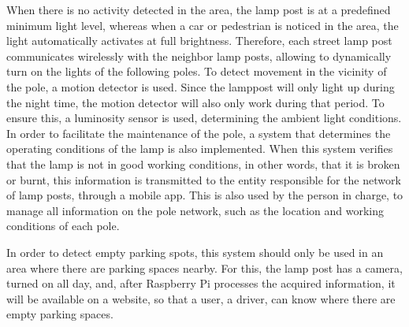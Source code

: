 When there is no activity detected in the area, the lamp post is at a predefined minimum light level, whereas when a car or pedestrian is noticed in the area, the light automatically activates at full brightness. Therefore, each street lamp post communicates wirelessly with the neighbor lamp posts, allowing to dynamically turn on the lights of the following poles. To detect movement in the vicinity of the pole, a motion detector is used. Since the lamppost will only light up during the night time, the motion detector will also only work during that period. To ensure this, a luminosity sensor is used, determining the ambient light conditions. In order to facilitate the maintenance of the pole, a system that determines the operating conditions of the lamp is also implemented. When this system verifies that the lamp is not in good working conditions, in other words, that it is broken or burnt, this information is transmitted to the entity responsible for the network of lamp posts, through a mobile app. This is also used by the person in charge, to manage all information on the pole network, such as the location and working conditions of each pole.

In order to detect empty parking spots, this system should only be used in an area where there are parking spaces nearby. For this, the lamp post has a camera, turned on all day, and, after Raspberry Pi processes the acquired information, it will be available on a website, so that a user, a driver, can know where there are empty parking spaces.


